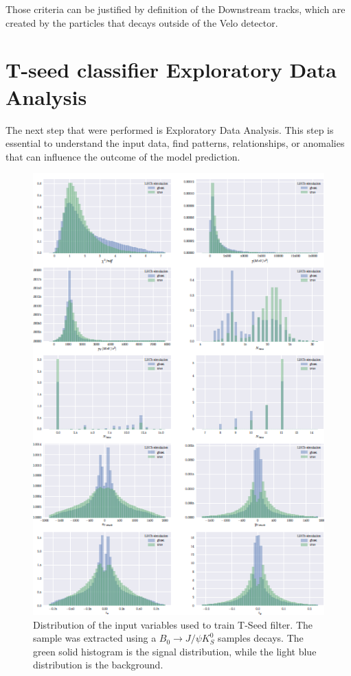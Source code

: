 Those criteria can be justified by definition of the Downstream tracks, which are created by the particles that decays outside of the Velo detector. 

\section{T-seed classifier Exploratory Data Analysis}

The next step that were performed is Exploratory Data Analysis. This step is essential to understand the input data, find patterns, relationships, or anomalies that can influence the outcome of the model prediction.   

\begin{figure}
\centering
\includegraphics[scale=0.9]{figures/features_2.png}
\caption{Distribution of the input variables used to train T-Seed filter. The sample was extracted using a $B_0\rightarrow J/\psi K_S^0 $ samples decays. The green solid histogram is the signal distribution, while the light blue
distribution is the background.
\label{fig:input features}}
\end{figure}

